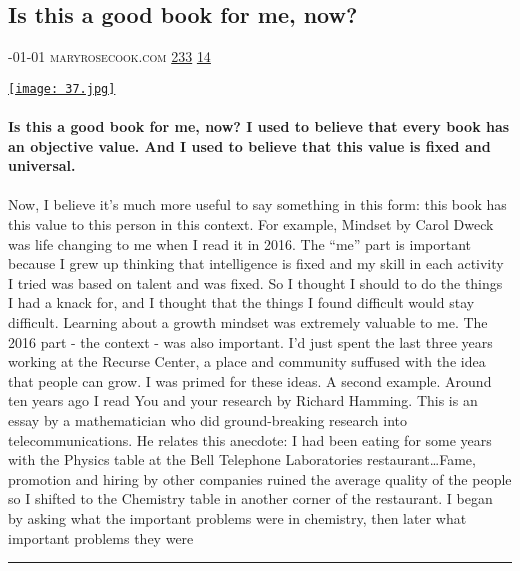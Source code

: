 \documentclass[10pt,a4paper]{article}
\begin{document}
\begin{multicols}{2}
\begin{minipage}{\linewidth}
\subsection{Is this a good book for me, now?}
\textsc{\footnotesize
{\scriptsize\faCalendar}-01-01 
{\scriptsize\faGlobe}\space 
maryrosecook.com 
{\scriptsize\faThumbsOUp}\space 
\href{http://news.ycombinator.com/item?id=37144601\&utm\_term=comment}{233} 
{\scriptsize\faComments}\space 
\href{http://news.ycombinator.com/item?id=37144601\&utm\_term=comment}{14} 
}
\par\medskip\noindent
\href{https://maryrosecook.com/blog/post/is-this-a-good-book-for-me-now?utm\_source=hackernewsletter\&utm\_medium=email\&utm\_term=books}{
    \texttt{[image: 37.jpg]}
}
\end{minipage}
\paragraph{}
\textbf{Is this a good book for me, now?
I used to believe that every book has an objective value. And I used to believe that this value is fixed and universal.}
\paragraph{}

Now, I believe it’s much more useful to say something in this form: this book has this value to this person in this context.
For example, Mindset by Carol Dweck was life changing to me when I read it in 2016.
The “me” part is important because I grew up thinking that intelligence is fixed and my skill in each activity I tried was based on talent and was fixed. So I thought I should to do the things I had a knack for, and I thought that the things I found difficult would stay difficult. Learning about a growth mindset was extremely valuable to me.
The 2016 part - the context - was also important. I’d just spent the last three years working at the Recurse Center, a place and community suffused with the idea that people can grow. I was primed for these ideas.
A second example. Around ten years ago I read You and your research by Richard Hamming. This is an essay by a mathematician who did ground-breaking research into telecommunications. He relates this anecdote:
I had been eating for some years with the Physics table at the Bell Telephone Laboratories restaurant…Fame, promotion and hiring by other companies ruined the average quality of the people so I shifted to the Chemistry table in another corner of the restaurant. I began by asking what the important problems were in chemistry, then later what important problems they were 
\par\noindent\textcolor{red}{\rule{\linewidth}{0.2mm}}
\vfill
\null
\noindent\begin{minipage}{\linewidth}

\end{minipage}
\end{multicols}
\end{document}
